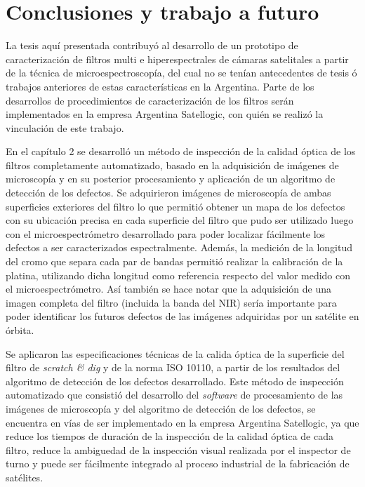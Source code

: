 \singlespacing
\chapter{Conclusiones y trabajo a futuro}
\label{chap:concls}

\hspace{0.5cm}La tesis aquí presentada contribuyó al desarrollo de un prototipo de caracterización de filtros multi e hiperespectrales de cámaras satelitales a partir de la técnica de microespectroscopía, del cual no se tenían antecedentes de tesis ó trabajos anteriores de estas características en la Argentina. Parte de los desarrollos de procedimientos de caracterización de los filtros serán implementados en la empresa Argentina Satellogic, con quién se realizó la vinculación de este trabajo.

En el capítulo 2 se desarrolló un método de inspección de la calidad óptica de los filtros completamente automatizado, basado en la adquisición de imágenes de microscopía y en su posterior procesamiento y aplicación de un algoritmo de detección de los defectos. Se adquirieron imágenes de microscopía de ambas superficies exteriores del filtro lo que permitió obtener un mapa de los defectos con su ubicación precisa en cada superficie del filtro que pudo ser utilizado luego con el microespectrómetro desarrollado para poder localizar fácilmente los defectos a ser caracterizados espectralmente. Además, la medición de la longitud del cromo que separa cada par de bandas permitió realizar la calibración de la platina, utilizando dicha longitud como referencia respecto del valor medido con el microespectrómetro. Así también se hace notar que la adquisición de una imagen completa del filtro (incluida la banda del NIR) sería importante para poder identificar los futuros defectos de las imágenes adquiridas por un satélite en órbita.

Se aplicaron las especificaciones técnicas de la calida óptica de la superficie del filtro de \textit{scratch \& dig} y de la norma ISO 10110, a partir de los resultados del algoritmo de detección de los defectos desarrollado. Este método de inspección automatizado que consistió del desarrollo del \textit{software} de procesamiento de las imágenes de microscopía y del algoritmo de detección de los defectos, se encuentra en vías de ser implementado en la empresa Argentina Satellogic, ya que reduce los tiempos de duración de la inspección de la calidad óptica de cada filtro, reduce la ambiguedad de la inspección visual realizada por el inspector de turno y puede ser fácilmente integrado al proceso industrial de la fabricación de satélites. 

